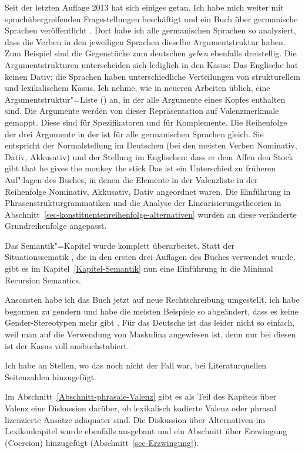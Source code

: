 Seit der letzten Auf\/lage 2013 hat sich einiges getan. Ich habe mich weiter mit sprachübergreifenden Fragestellungen
beschäftigt und ein Buch über germanische Sprachen veröffentlicht \citep{MuellerGermanic}. Dort habe
ich alle germanischen Sprachen so analysiert, dass die Verben in den jeweiligen Sprachen dieselbe
Argumentstruktur haben. Zum Beispiel sind die Gegenstücke zum deutschen \emph{geben} ebenfalls
dreistellig. Die Argumentstrukturen unterscheiden sich lediglich in den Kasus: Das Englische hat keinen
Dativ; die Sprachen haben unterschiedliche Verteilungen von strukturellem und lexikalischem
Kasus. Ich nehme, wie in neueren Arbeiten üblich, eine Argumentstruktur"=Liste (\argst) an, in der 
alle Argumente eines Kopfes enthalten sind. Die Argumente werden von dieser Repräsentation auf
Valenzmerkmale gemappt. Diese sind \spr für Spezifikatoren und \comps für Komplemente. Die
Reihenfolge der drei Argumente in der \argst ist für alle germanischen Sprachen gleich. Sie
entspricht der Normalstellung im Deutschen (bei den meisten Verben Nominativ, Dativ, Akkusativ) und der Stellung im
Englischen:
\eal
\ex dass er dem Affen den Stock gibt
\ex that he gives the monkey the stick
\zl
Das ist ein Unterschied zu früheren Auf"|lagen des Buches, in denen die Elemente in der Valenzliste
\subcat in der Reihenfolge Nominativ, Akkusativ, Dativ angeordnet waren. Die Einführung in
Phrasenstrukturgrammatiken und die Analyse der Linearisierungstheorien in Abschnitt~\ref{sec-konstituentenreihenfolge-alternativen} wurden an
diese veränderte Grundreihenfolge angepasst.

Das Semantik"=Kapitel wurde komplett überarbeitet. Statt der Situationssematik \citep*{BP83a,CMP90,Devlin92}, die in den ersten
drei Auf\/lagen des Buches verwendet wurde, gibt es im Kapitel~\ref{Kapitel-Semantik} nun eine
Einführung in die Minimal Recursion Semantics\indexmrs \citep*{CFPS2005a}.

Ansonsten habe ich das Buch jetzt auf neue Rechtschreibung umgestellt, ich habe begonnen zu gendern
und habe die meisten Beispiele so abgeändert, dass es keine Gender-Stereotypen mehr gibt
\citep{MB97a,PCKSDMC2017a}. Für das Deutsche ist das leider nicht so einfach, weil man auf die
Verwendung von Maskulina angewiesen ist, denn nur bei diesen ist der Kasus voll ausbuchstabiert. 

Ich habe an Stellen, wo das noch nicht der Fall war, bei Literaturquellen Seitenzahlen hinzugefügt.

Im Abschnitt~\ref{Abschnitt-phrasale-Valenz} gibt es als Teil des Kapitels über Valenz eine Diskussion darüber, ob lexikalisch kodierte Valenz oder phrasal
lizenzierte Ansätze adäquater sind. Die Diskussion über Alternativen im Lexikonkapitel wurde
ebenfalls ausgebaut und ein Abschnitt über Erzwingung (Coercion) hinzugefügt (Abschnitt~\ref{sec-Erzwingung}).

